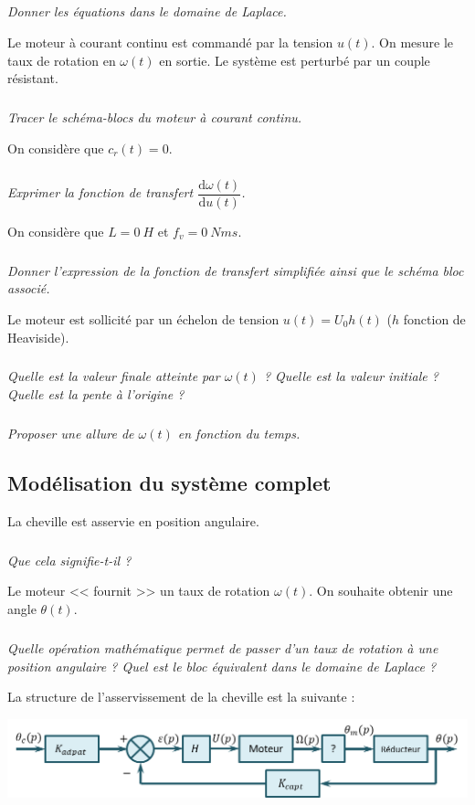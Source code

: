 \documentclass[10pt,fleqn]{article} %
\begin{document}
\begin{multicols}{2}
\subparagraph{}\textit{Donner les équations dans le domaine de Laplace.}

\vspace{.25cm}

Le moteur à courant continu est commandé par la tension $u(t)$. On mesure le taux de rotation en $\omega(t)$ en sortie. Le système est perturbé par un couple résistant. 

\subparagraph{}\textit{Tracer le schéma-blocs du moteur à courant continu.}

\vspace{.25cm}

On considère que $c_r(t)=0$.

\subparagraph{}\textit{Exprimer la fonction de transfert $\dfrac{\text{d}\omega(t)}{\text{d}u(t)}$.}


\vspace{.25cm}

On considère que $L=\SI{0}{H}$ et $f_v=\SI{0}{Nms}$.

\subparagraph{}\textit{Donner l'expression de la fonction de transfert simplifiée ainsi que le schéma bloc associé.}


Le moteur est sollicité par un échelon de tension $u(t)=U_0 h(t)$ ($h$ fonction de Heaviside).

\subparagraph{}\textit{Quelle est la valeur finale atteinte par $\omega(t)$ ? Quelle est la valeur initiale ? Quelle est la pente à l'origine ?}

\subparagraph{}\textit{Proposer une allure de $\omega(t)$ en fonction du temps.}


\subsection*{Modélisation du système complet}
La cheville est asservie en position angulaire.
\subparagraph{}\textit{Que cela signifie-t-il ?}

\vspace{.25cm}

Le moteur << fournit >> un taux de rotation $\omega(t)$. On souhaite obtenir une angle $\theta(t)$.
\subparagraph{}\textit{Quelle opération mathématique permet de passer d'un taux de rotation à une position angulaire ? Quel est le bloc équivalent  dans le domaine de Laplace ?}

La structure de l'asservissement de la cheville est la suivante :

\begin{center}
\includegraphics[width=\linewidth]{images/fig_04}
\end{center}



\end{multicols}
\end{document}
